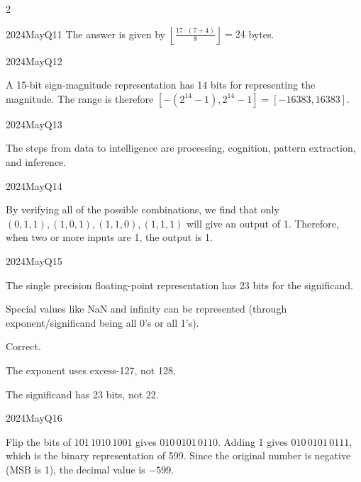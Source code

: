 \begin{multicols}{2}
\begin{qsolution}{2024}{May}{Q11}{\tgCE}
    The answer is given by $\displaystyle\left\lfloor\frac{17\cdot(7+4)}{8}\right\rfloor=24$ bytes.
\end{qsolution}

\begin{qsolution}[20]{2024}{May}{Q12}{\tgCE \tgCESignMagRepr}

    A 15-bit sign-magnitude representation has 14 bits for representing the magnitude.
    The range is therefore $[-(2^{14}-1), 2^{14}-1] = [-16383, 16383]$.
\end{qsolution}

\begin{qsolution}{2024}{May}{Q13}{\tgCE \tgCEAI}

    The steps from data to intelligence are processing, cognition, pattern extraction, and inference.
\end{qsolution}

\begin{qsolution}{2024}{May}{Q14}{\tgCE \tgCELogicalCircuits}

    By verifying all of the possible combinations, we find that only $(0,1,1), (1,0,1), (1,1,0), (1,1,1)$ will give an output of 1.
    Therefore, when two or more inputs are 1, the output is 1.
\end{qsolution}

\begin{qsolution}{2024}{May}{Q15}{\tgCE \tgCEIEEESinglePrecision}

    \begin{enumualpha}
        \item The single precision floating-point representation has 23 bits for the significand.
        \item Special values like NaN and infinity can be represented (through exponent/significand being all 0's or all 1's).
        \item Correct.
        \item The exponent uses excess-127, not 128.
        \item The significand has 23 bits, not 22.
    \end{enumualpha}
\end{qsolution}

\begin{qsolution}{2024}{May}{Q16}{\tgCE \tgCETwosComplement}

    Flip the bits of $101\,1010\,1001$ gives $010\,0101\,0110$.
    Adding 1 gives $010\,0101\,0111$, which is the binary representation of 599.
    Since the original number is negative (MSB is 1), the decimal value is $-599$.
\end{qsolution}


\end{multicols}
